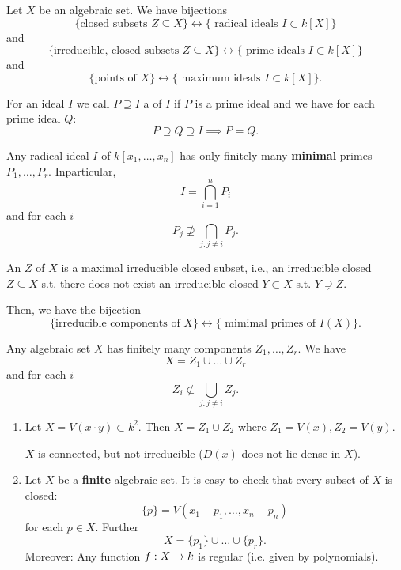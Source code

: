 \begin{lemma}
	Let $X$ be an algebraic set. We have bijections
	\[
	\{ \text{closed subsets } Z \subseteq X\} \leftrightarrow \{ \text{ radical ideals } I \subset k[X]\}
	\]
	and
	\[
	\{ \text{irreducible, closed subsets } Z \subseteq X\} \leftrightarrow \{ \text{ prime ideals } I \subset k[X]\}
	\]
		and
	\[
	\{ \text{points of } X\} \leftrightarrow \{ \text{ maximum ideals } I \subset k[X]\}.
	\]
\end{lemma}
\begin{lemma}
For an ideal $I$ we call $P \supseteq I$ a  of $I$ if $P$ is a prime ideal and we have for each prime ideal $Q$:
\[ P \supseteq Q \supseteq I \implies P = Q. \]

Any radical ideal $I $ of $k[x_1, \ldots, x_n]$ has only finitely many \textbf{minimal} primes $P_1,\ldots, P_r$.
Inparticular,
\[ I = \bigcap_{i=1}^n P_i \]
and for each $i$
\[ P_j \not \supseteq \bigcap_{j : j \neq i} P_j. \]
\end{lemma}

\begin{definition}
An  $Z$ of $X$ is a maximal irreducible closed subset, i.e., an irreducible closed $Z \subseteq X$ s.t. there does not exist an irreducible closed $Y \subset X$ s.t. $Y \supsetneq Z$.

Then, we have the bijection
	\[
\{ \text{irreducible components of } X\} \leftrightarrow \{ \text{ mimimal primes of } I(X)\}.
\]
\end{definition}

\begin{lemma}
Any algebraic set $X$ has finitely many components $Z_1, \ldots, Z_r$. We have
\[ X = Z_1 \cup \ldots \cup Z_r \]
and for each $i$
\[ Z_i \not \subset \bigcup_{j : j \neq i}Z_j. \]
\end{lemma}

\begin{example}
	\begin{enumerate}
		\item 	Let $X = V(x\cdot y) \subset k^2$. Then $X = Z_1\cup Z_2$ where $Z_1 = V(x), Z_2 = V(y)$.
		
		$X$ is connected, but not irreducible ($D(x)$ does not lie dense in $X$).
		\item Let $X$ be a \textbf{finite} algebraic set. It is easy to check that every subset of $X$ is closed:
		\[ \{p\} = V(x_1-p_1, \ldots, x_n-p_n) \]
		for each $p \in X$. Further
		\[ X = \{p_1\}\cup \ldots \cup \{p_r\}. \]
		Moreover: Any function $f : X \overset{}{\rightarrow} k$ is regular (i.e. given by polynomials).
	\end{enumerate}
\end{example}

